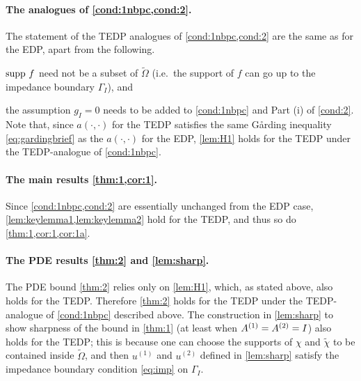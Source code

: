 \paragraph{The analogues of \cref{cond:1nbpc,cond:2}.}
The statement of the TEDP analogues of \cref{cond:1nbpc,cond:2} are the same as for the EDP, apart from the following.
\ben
\item
$\operatorname{supp} \,f$ need not be a subset of $\widetilde{\Omega}$ (i.e.~the support of $f$ can go up to the impedance boundary $\Gamma_I$), and
\item the assumption $g_I= 0$ needs to be added to \cref{cond:1nbpc} and Part (i) of \cref{cond:2}.
\een
 Note that, since $a(\cdot,\cdot)$ for the TEDP satisfies the same G\aa rding inequality \cref{eq:gardingbrief} as the $a(\cdot,\cdot)$ for the EDP, \cref{lem:H1} holds for the TEDP under the TEDP-analogue of \cref{cond:1nbpc}.

\paragraph{The main results \cref{thm:1,cor:1}.}
Since \cref{cond:1nbpc,cond:2} are essentially unchanged from the EDP case, \cref{lem:keylemma1,lem:keylemma2} hold for the TEDP, and thus so do \cref{thm:1,cor:1,cor:1a}.

\paragraph{The PDE results \cref{thm:2} and \cref{lem:sharp}.}

The PDE bound \cref{thm:2} relies only on \cref{lem:H1}, which, as stated above, also holds for the TEDP. Therefore \cref{thm:2} holds for the TEDP under the TEDP-analogue of \cref{cond:1nbpc} described above. The construction in \cref{lem:sharp} to show sharpness of the bound in \cref{thm:1} (at least when ${A}^{(1)}= {A}^{(2)}= I$) also holds for the TEDP; this is because one can choose the supports of $\chi$ and $\widetilde{\chi}$ to be contained inside $\widetilde{\Omega}$, and then $u^{(1)}$ and $u^{(2)}$ defined in \cref{lem:sharp} satisfy the impedance boundary condition \cref{eq:imp} on $\Gamma_I$.



